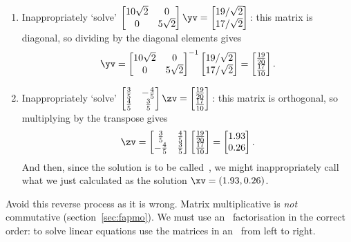 \begin{example}
\begin{enumerate}
\item Inappropriately `solve' \(\begin{bmatrix} 10\sqrt2&0\\0&5\sqrt2 \end{bmatrix}\yv=\begin{bmatrix} 19/\sqrt2\\17/\sqrt2 \end{bmatrix}\)\,:  this matrix is diagonal, so dividing by the diagonal elements gives 
\begin{equation*}
\yv=\begin{bmatrix} 10\sqrt2&0\\0&5\sqrt2 \end{bmatrix}^{-1}
\begin{bmatrix} 19/\sqrt2\\17/\sqrt2 \end{bmatrix}
=\begin{bmatrix} \frac{19}{20}\\\frac{17}{10} \end{bmatrix}.
\end{equation*}

\item Inappropriately `solve' \(\begin{bmatrix} \frac35&-\frac45\\\frac45&\frac35 \end{bmatrix}\zv=\begin{bmatrix} \frac{19}{20}\\\frac{17}{10} \end{bmatrix}\)\,: this matrix is orthogonal, so multiplying by the transpose gives 
\begin{equation*}
\zv=\begin{bmatrix} \frac35&\frac45\\-\frac45&\frac35 \end{bmatrix}
\begin{bmatrix} \frac{19}{20}\\\frac{17}{10} \end{bmatrix}
=\begin{bmatrix} 1.93\\0.26 \end{bmatrix}.
\end{equation*}
And then, since the solution is to be called~\xv, we might inappropriately call what we just calculated as the solution \(\xv=(1.93,0.26)\).
\end{enumerate}
\end{example}
Avoid this reverse process as it is wrong.
Matrix multiplicative is \emph{not} commutative (section~\ref{sec:fapmo}).  
We must use an \svd\ factorisation in the correct order: to solve linear equations use the matrices in an \svd\ from left to right.





